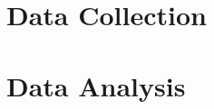 \section{Data Collection}
\label{sec:data-collection}


\section{Data Analysis}
\label{sec:data-analysis}
